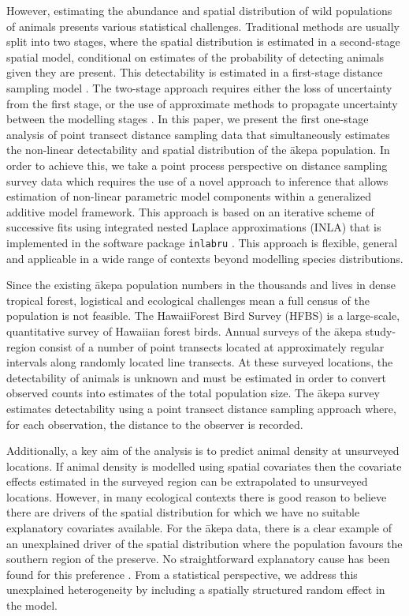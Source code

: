 \documentclass{statsoc}
\newcommand{\akepa}{\textquotesingle\={a}kepa}  %
\newcommand{\hawaii}{Hawai\textquotesingle i}   %
\begin{document}
However, estimating the abundance and spatial distribution of wild populations of animals presents various statistical challenges. Traditional methods are usually split into two stages, where the spatial distribution is estimated in a second-stage spatial model, conditional on estimates of the probability of detecting animals given they are present.  This detectability is estimated in a first-stage distance sampling model \citep{millerExtendingDensitySurface2021, miller_spatial_2013}.  The two-stage approach requires either the loss of uncertainty from the first stage, or the use of approximate methods to propagate uncertainty between the modelling stages \citep{bravington_VariancePropagationDensity_2021}.  In this paper, we present the first one-stage analysis of point transect distance sampling data that simultaneously estimates the non-linear detectability and spatial distribution of the \akepa{} population.  In order to achieve this, we take a point process perspective on distance sampling survey data which requires the use of a novel approach to inference that allows estimation of non-linear parametric model components within a generalized additive model framework. This approach is based on an iterative scheme of successive fits using integrated nested Laplace approximations (INLA) \citep{rue_approximate_2009} that is implemented in the software package \texttt{inlabru} \citep{lindgren_inlabru_2024}.  This approach is flexible, general and applicable in a wide range of contexts beyond modelling species distributions.

Since the existing \akepa{} population numbers in the thousands and lives in dense tropical forest, logistical and ecological challenges mean a full census of the population is not feasible. The \hawaii Forest Bird Survey (HFBS) \citep{scott_HFBS_1986} is a large-scale, quantitative survey of Hawaiian forest birds.  Annual surveys of the \akepa{} study-region consist of a number of point transects located at approximately regular intervals along randomly located line transects.  At these surveyed locations, the detectability of animals is unknown and must be estimated in order to convert observed counts into estimates of the total population size.  The \akepa{} survey estimates detectability using a point transect distance sampling approach \citep{buckland_distance_2015} where, for each observation, the distance to the observer is recorded. 

Additionally, a key aim of the analysis is to predict animal density at unsurveyed locations.  If animal density is modelled using spatial covariates then the covariate effects estimated in the surveyed region can be extrapolated to unsurveyed locations.  However, in many ecological contexts there is good reason to believe there are drivers of the spatial distribution for which we have no suitable explanatory covariates available. For the \akepa{} data, there is a clear example of an unexplained driver of the spatial distribution where the population favours the southern region of the preserve.  No straightforward explanatory cause has been found for this preference \citep{camp_dsm_2020}.  From a statistical perspective, we address this unexplained heterogeneity by including a spatially structured random effect in the model.  
\end{document}
